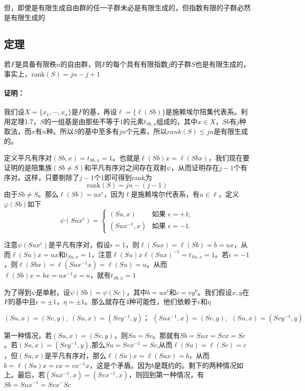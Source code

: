 \documentclass[UTF8]{article}
\begin{document}
	但，即使是有限生成自由群的任一子群未必是有限生成的，但指数有限的子群必然是有限生成的
	
	\subsection{定理}
	若$F$是具备有限秩$n$的自由群，则$F$的每个具有有限指数$j$的子群$S$也是有限生成的，事实上，$\text{rank}(S) = jn-j+1$
	
	\paragraph{证明：} 我们设$X = \{x_1,\cdots,x_n\}$是$F$的基，再设$\ell = \{\ell(Sb)\}$是施赖埃尔陪集代表系。利用定理1.7，$S$的一组基是由那些不等于$1$的元素$t_{Sb,x}$组成的，其中$x\in X$，$Sb$有$j$种取法，而$x$有$n$种。所以$S$的基中至多有$jn$个元素，所以$rank(S)\leq jn$是有限生成的。
	
	定义平凡有序对$(Sb,x) = t_{Sb,x} = 1$。也就是$\ell(Sb)x = \ell(Sbx)$，我们现在要证明的是陪集族$(Sb\neq S)$和平凡有序对之间存在双射$\psi$，从而证明存在$j-1$个有序对。这样，只要剔除了$j-1$个1即可得到rank为
	$$
	\text{rank}(S) = jn - (j-1)
	$$
	由于$Sb\neq S$。那么$\ell(Sb) = ux^\epsilon$，因为$\ell$是施赖埃尔代表系，有$u\in \ell$，定义$\varphi(Sb)$如下
\[
\psi(Sux^\epsilon) = 
\begin{cases} 
	(Su, x) & \text{如果 } \epsilon = +1; \\ 
	(Sux^{-1}, x) & \text{如果 } \epsilon = -1. 
\end{cases}
\]

注意$\psi(Sux^\epsilon)$是平凡有序对，假设$\epsilon = 1$，则$\ell(Sux) = \ell(Sb) = b = ux$，从而$\ell(Su)x = ux$和$t_{Su,x} = 1$，注意$\ell(Su)x\ell(Sux)^{-1} = t_{Su,x} = 1$。若$\epsilon = -1$，则$\ell(Sbx) = \ell(Sux^{-1}x) = \ell(Su) = u$。从而$\ell(Sb)x = bx = ux^{-1}x = u$，就有$t_{Sb,x} = 1$

为了得到$\psi$是单射，设$\psi(Sb) = \psi(Sc)$，其中$b = ux^\epsilon$和$c = vy^\eta$。我们假设$x,y$在$F$的基中且$\epsilon = \pm 1$，$\eta = \pm 1$。那么就存在4种可能性，他们依赖于$\epsilon$和$\eta$

$$
(Su,x) = (Sv,y),~ (Su,x) = (Svy^{-1},y)；~~(Sux^{-1},x) = (Sv,y),~~(Su,x) = (Svy^{-1},y)
$$

第一种情况，若$ (Su,x) = (Sv,y)$，则$Su= Sv$。那就有$Sb= Sux = Svx = Sc$。若$ (Su,x) = (Svy^{-1},y) $,那么$Su = Svx^{-1} = Sc$,从而$\ell(Su) = \ell(Sc) = c$，但$(Su,x)$是平凡有序对，那么$\ell(Su)x = \ell(Sux) = b$，从而$b = \ell(Su)x = cx = vx^{-1}x $，这是个矛盾。因为$b$是既约的。剩下的两种情况如上。最后，若$(Sux^{-1},x) = (Svx^{-1},x)$，则回到第一种情况，有$Sb = Sux^{-1} = Svx^{-} Sc$
\end{document}

